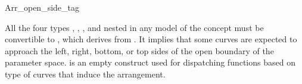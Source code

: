 
\ccRefPageBegin

\begin{ccRefClass}{Arr_open_side_tag}

\ccDefinition

All the four types ,
, ,
and  nested in any model of the
concept  must be convertible
to \ccRefName, which derives from . It
implies that some curves are expected to approach the left, right,
bottom, or top sides of the open boundary of the parameter
space. \ccRefName{} is an empty construct used for dispatching
functions based on type of curves that induce the arrangement.


\ccSeeAlso
  \\
    
\end{ccRefClass}

\ccRefPageEnd
